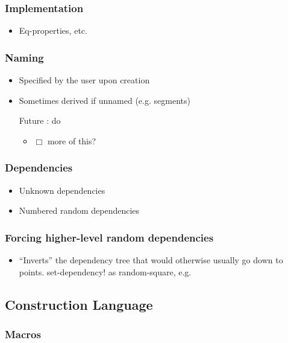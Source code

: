 \documentclass[11pt]{article}
\begin{document}
\subsubsection{Implementation}
\label{sec-3-5-1}

\begin{itemize}
\item Eq-properties, etc.
\end{itemize}
\subsubsection{Naming}
\label{sec-3-5-2}

\begin{itemize}
\item Specified by the user upon creation
\item Sometimes derived if unnamed (e.g. segments)
\item[Future]: do
\begin{itemize}
\item $\Box$ more of this?
\end{itemize}
\end{itemize}
\subsubsection{Dependencies}
\label{sec-3-5-3}

\begin{itemize}
\item Unknown dependencies
\item Numbered random dependencies
\end{itemize}
\subsubsection{Forcing higher-level random dependencies}
\label{sec-3-5-4}

\begin{itemize}
\item ``Inverts'' the dependency tree that would otherwise usually go
      down to points. set-dependency! as random-square, e.g.
\end{itemize}
\subsection{Construction Language}
\label{sec-3-6}
\subsubsection{Macros}
\label{sec-3-6-1}
\end{document}
